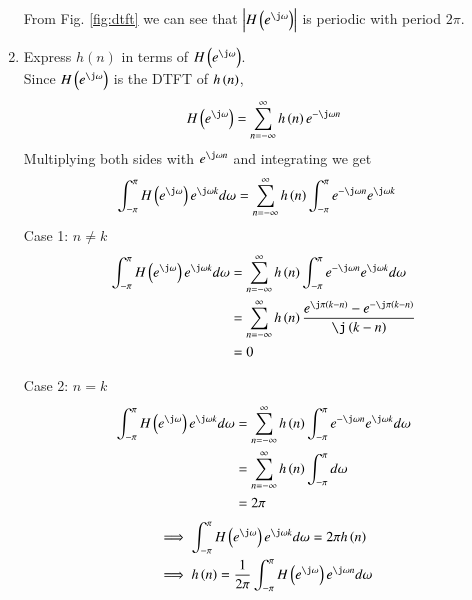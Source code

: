 \documentclass[journal,12pt,twocolumn]{IEEEtran}
\renewcommand\thesection{\arabic{section}}
\begin{document}
\begin{enumerate}[label=\thesection.\arabic*]
From Fig. \ref{fig:dtft} we can see that $\abs{H\brak{e^{\j \omega}}}$ is periodic with period $2\pi$.
\\
\item Express $h(n)$ in terms of $H\brak{e^{\j \omega}}$.\\
\solution
Since $H\brak{e^{\j \omega}}$ is the DTFT of $h\left(n\right)$,
\begin{align}
	H\brak{e^{\j \omega}} = \sum _{n=-\infty }^{\infty }h\brak{n}e^{-\j \omega n}
\end{align}
Multiplying both sides with $e^{\j \omega n}$ and integrating we get
\begin{align}
	\int_{-\pi}^{\pi}H\brak{e^{\j \omega}} e^{\j \omega k} d\omega&= \sum _{n=-\infty }^{\infty }h\brak{n}\int_{-\pi}^{\pi}e^{-\j \omega n} e^{\j \omega k}
\end{align}
	Case 1: $n \neq k$
\begin{align}
	\int_{-\pi}^{\pi}H\brak{e^{\j \omega}} e^{\j \omega k} d\omega&= \sum _{n=-\infty }^{\infty }h\brak{n}\int_{-\pi}^{\pi}e^{-\j \omega n} e^{\j \omega k}d\omega \\
	&=\sum _{n=-\infty }^{\infty }h\brak{n}\frac{e^{\j \pi \brak{k-n}}- e^{-\j \pi \brak{k-n}}}{\j \brak{k-n}}\\
	&=0
\end{align}

	Case 2: $n = k$
\begin{align}
	\int_{-\pi}^{\pi}H\brak{e^{\j \omega}} e^{\j \omega k} d\omega&= \sum _{n=-\infty }^{\infty }h\brak{n}\int_{-\pi}^{\pi}e^{-\j \omega n} e^{\j \omega k}d\omega \\
	&=\sum _{n=-\infty }^{\infty }h\brak{n}\int_{-\pi}^{\pi}d\omega \\
	&= 2\pi
\end{align}
\begin{align}
	&\implies \int_{-\pi}^{\pi}H\brak{e^{\j \omega}} e^{\j \omega k} d\omega =2\pi h\brak{n}\\
	&\implies h\brak{n} = \frac{1}{2\pi} \int_{-\pi}^{\pi} H\brak{e^{\j \omega}}e^{\j \omega n} d\omega
\end{align}
\end{enumerate}
\end{document}
